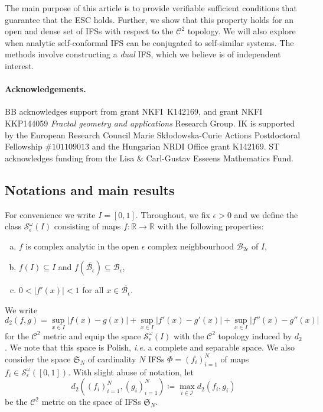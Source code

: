 \documentclass[11pt,]{article}
\theoremstyle{definition}
\theoremstyle{remark}
\newcommand{\0}{\mathbf{0}}
\newcommand{\ie}{{\it i.e.}\/ }
\begin{document}
The main purpose of this article is to provide verifiable sufficient conditions that guarantee that the
ESC holds. Further, we show that this property holds for an open and dense set of IFSs with respect to the
$\mathcal{C}^2$ topology. We will also explore when analytic self-conformal IFS can be conjugated to
self-similar systems.
The methods involve constructing a \emph{dual} IFS, which we believe is of independent interest. 

\paragraph{Acknowledgements.} BB acknowledges support from grant NKFI~K142169, and grant NKFI
KKP144059 \textit{Fractal geometry and applications} Research Group. IK is supported by the European
Research Council Marie Sk\l odowska-Curie Actions Postdoctoral Fellowship $\#101109013$ and the
Hungarian NRDI Office grant K142169. ST acknowledges funding from the Lisa \& Carl-Gustav
Esseens Mathematics Fund.

\subsection{Notations and main results}
For convenience we write $I=[0,1]$.
Throughout, we fix $\epsilon>0$ and  we define the class $\mathcal{S}^\omega_\epsilon(I)$
consisting of maps $f:\mathbb{R}\to\mathbb{R}$ with the following properties:
\begin{enumerate}[a)]
  \item\label{it:a} $f$ is complex analytic in the open $\epsilon$ complex neighbourhood
    $\mathcal{B}_{2\epsilon}$ of  $I$,
  \item\label{it:b} $f(I) \subseteq I$ and $f(\overline{\mathcal{B}_{\epsilon}}) \subseteq
    \mathcal{B}_{\epsilon}$,
  \item\label{it:c} $0<|f'(x)|<1$ for all $x\in\overline{\mathcal{B}_{\epsilon}}$.
\end{enumerate}
We write
\[
  d_2(f,g) = \sup_{x\in I} |f(x)-g(x)|+\sup_{x\in I} |f'(x)-g'(x)| +\sup_{x\in I} |f''(x)-g''(x)|
\]
for the $\mathcal{C}^2$ metric and equip the space $\mathcal{S}^\omega_\epsilon(I)$ with the
$\mathcal{C}^2$ topology induced by $d_2$. We note that this space is Polish, \ie a complete
and separable space.
We also consider the space $\mathfrak{S}_N$ of cardinality $N$ IFSs $\Phi=(f_i)_{i=1}^N$ of maps $f_i\in
\mathcal{S}^\omega_\epsilon([0,1])$. With slight abuse of notation, let
$$
d_2((f_i)_{i=1}^N,(g_i)_{i=1}^N)\coloneqq\max_{i\in\mathcal{I}}d_2(f_i,g_i)
$$
be the $\mathcal{C}^2$ metric on the space of IFSs $\mathfrak{S}_N$.
\end{document}

